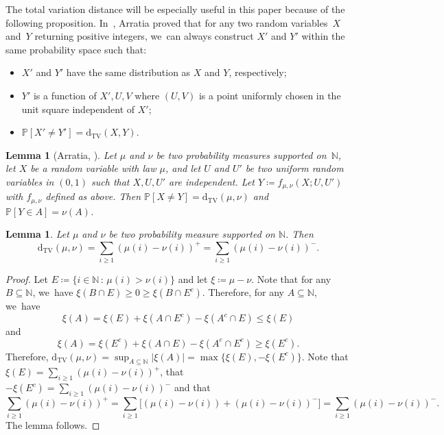 \documentclass[10pt,a4paper]{article}
\newcommand{\NN}{\mathbb{N}}
\newcommand{\PP}{\mathbb{P}}
\newcommand{\dtv}{\mathrm{d}_{\mathrm{TV}}}
\newcommand{\bg}{\big}
\theoremstyle{plain}
\newtheorem{lem}[cor]{Lemma}
\theoremstyle{definition}
\begin{document}
The total variation distance will be especially useful in this paper because of the following proposition. In~\cite[\S 3.8]{Arratia02}, Arratia proved that for any two random variables~$X$ and~$Y$ returning positive integers, we~can always construct $X'$ and $Y'$ within the same probability space such that:
\begin{itemize}
\item $X'$ and $Y'$ have the same distribution as $X$ and $Y$, respectively;

\item $Y'$ is a function of $X', U, V$ where $(U, V)$ is a point uniformly chosen in the unit square independent of $X'$;

\item $\PP[X' \ne Y'] = \dtv(X, Y)$.
\end{itemize}

\begin{lem}[Arratia, \cite{Arratia02}]
\label{lem:coupling-dtv}
Let $\mu$ and $\nu$ be two probability measures supported on~$\NN$, let $X$ be a random variable with law $\mu$, and let $U$ and $U'$ be two uniform random variables in $(0, 1)$ such that $X, U, U'$ are independent. Let $Y \coloneqq f_{\mu, \nu}(X; U, U')$ with $f_{\mu, \nu}$ defined as above. Then $\PP[X \ne Y] = \dtv(\mu, \nu)$ and $\PP[Y \in A] = \nu(A)$.
\end{lem}

\begin{lem}
\label{lem:equiv-def-dtv}
Let $\mu$ and $\nu$ be two probability measure supported on $\NN$. Then
\[
\dtv(\mu, \nu) = \sum_{i \ge 1} (\mu(i) - \nu(i))^+ = \sum_{i \ge 1} (\mu(i) - \nu(i))^-.
\]
\end{lem}

\begin{proof}
Let $E \coloneqq \{i \in \NN \, : \, \mu(i) > \nu(i)\}$ and let $\xi\coloneqq \mu - \nu$. Note that for any $B\subseteq \NN$, we~have $\xi(B\cap E) \ge 0 \ge \xi(B\cap E^c)$. Therefore, for any $A \subseteq \NN$, we~have
\[
\xi(A) = \xi(E) + \xi(A \cap E^c) - \xi(A^c \cap E) \le \xi(E)
\]
and
\[
\xi(A) = \xi(E^c) + \xi(A \cap E) - \xi(A^c \cap E^c) \ge \xi(E^c).
\]
Therefore, $\dtv(\mu, \nu) = \sup_{A \subseteq \NN} |\xi(A)| = \max\{\xi(E), -\xi(E^c)\}$. Note that $\xi(E) = \sum_{i \ge 1} (\mu(i) - \nu(i))^+$, that $-\xi(E^c) = \sum_{i \ge 1} (\mu(i) - \nu(i))^-$ and that
\[
\sum_{i \ge 1} (\mu(i) - \nu(i))^+ = \sum_{i \ge 1} \bg[(\mu(i) - \nu(i)) + (\mu(i) - \nu(i))^-\bg] = \sum_{i \ge 1} (\mu(i) - \nu(i))^-.
\]
The lemma follows.
\end{proof}
\end{document}
